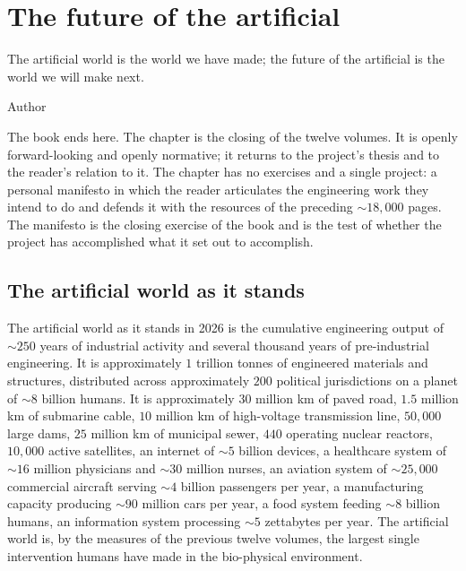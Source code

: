 \chapter{The future of the artificial}
\label{vol12:ch14}

\epigraph{The artificial world is the world we have made; the future of the artificial is the world we will make next.}{Author}


\noindent
The book ends here. The chapter is the closing of the twelve volumes. It is openly forward-looking and openly normative; it returns to the project's thesis and to the reader's relation to it. The chapter has no exercises and a single project: a personal manifesto in which the reader articulates the engineering work they intend to do and defends it with the resources of the preceding $\sim 18{,}000$ pages. The manifesto is the closing exercise of the book and is the test of whether the project has accomplished what it set out to accomplish.

\section{The artificial world as it stands}

The artificial world as it stands in 2026 is the cumulative engineering output of $\sim 250$ years of industrial activity and several thousand years of pre-industrial engineering. It is approximately $1$ trillion tonnes of engineered materials and structures, distributed across approximately $200$ political jurisdictions on a planet of $\sim 8$ billion humans. It is approximately $30$ million km of paved road, $1.5$ million km of submarine cable, $10$ million km of high-voltage transmission line, $50{,}000$ large dams, $25$ million km of municipal sewer, $440$ operating nuclear reactors, $10{,}000$ active satellites, an internet of $\sim 5$ billion devices, a healthcare system of $\sim 16$ million physicians and $\sim 30$ million nurses, an aviation system of $\sim 25{,}000$ commercial aircraft serving $\sim 4$ billion passengers per year, a manufacturing capacity producing $\sim 90$ million cars per year, a food system feeding $\sim 8$ billion humans, an information system processing $\sim 5$ zettabytes per year. The artificial world is, by the measures of the previous twelve volumes, the largest single intervention humans have made in the bio-physical environment.

